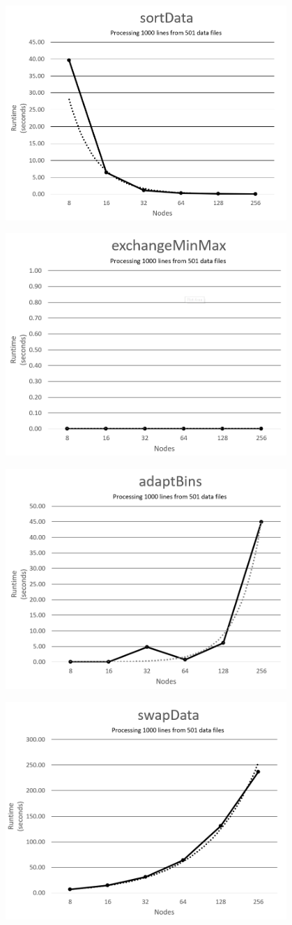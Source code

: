 \includegraphics[width=0.8\textwidth]{sortData.png}

\includegraphics[width=0.8\textwidth]{exchangeMinMax.png}

\includegraphics[width=0.8\textwidth]{adaptBins.png}

\includegraphics[width=0.8\textwidth]{swapData.png}
